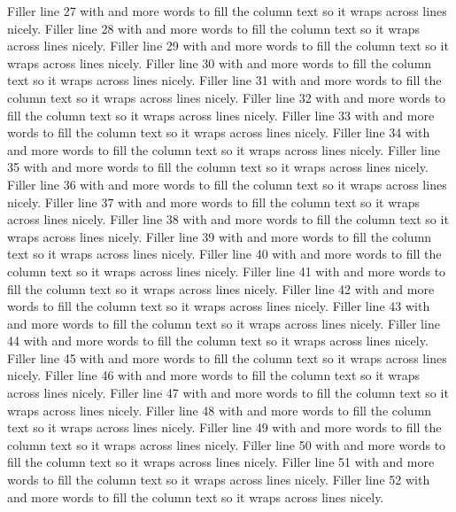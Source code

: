 Filler line 27 with  and more words to fill the column text so it wraps across lines nicely.
Filler line 28 with  and more words to fill the column text so it wraps across lines nicely.
Filler line 29 with  and more words to fill the column text so it wraps across lines nicely.
Filler line 30 with  and more words to fill the column text so it wraps across lines nicely.
Filler line 31 with  and more words to fill the column text so it wraps across lines nicely.
Filler line 32 with  and more words to fill the column text so it wraps across lines nicely.
Filler line 33 with  and more words to fill the column text so it wraps across lines nicely.
Filler line 34 with  and more words to fill the column text so it wraps across lines nicely.
Filler line 35 with  and more words to fill the column text so it wraps across lines nicely.
Filler line 36 with  and more words to fill the column text so it wraps across lines nicely.
Filler line 37 with  and more words to fill the column text so it wraps across lines nicely.
Filler line 38 with  and more words to fill the column text so it wraps across lines nicely.
Filler line 39 with  and more words to fill the column text so it wraps across lines nicely.
Filler line 40 with  and more words to fill the column text so it wraps across lines nicely.
Filler line 41 with  and more words to fill the column text so it wraps across lines nicely.
Filler line 42 with  and more words to fill the column text so it wraps across lines nicely.
Filler line 43 with  and more words to fill the column text so it wraps across lines nicely.
Filler line 44 with  and more words to fill the column text so it wraps across lines nicely.
Filler line 45 with  and more words to fill the column text so it wraps across lines nicely.
Filler line 46 with  and more words to fill the column text so it wraps across lines nicely.
Filler line 47 with  and more words to fill the column text so it wraps across lines nicely.
Filler line 48 with  and more words to fill the column text so it wraps across lines nicely.
Filler line 49 with  and more words to fill the column text so it wraps across lines nicely.
Filler line 50 with  and more words to fill the column text so it wraps across lines nicely.
Filler line 51 with  and more words to fill the column text so it wraps across lines nicely.
Filler line 52 with  and more words to fill the column text so it wraps across lines nicely.

